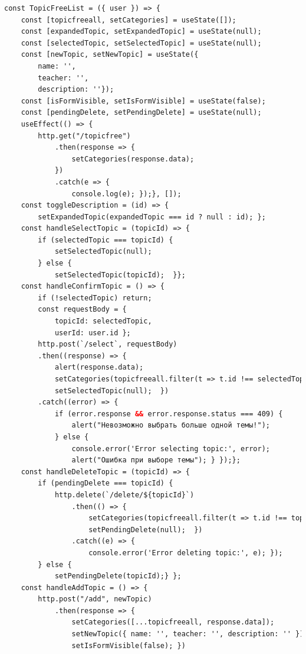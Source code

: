 \documentclass[14pt]{extarticle} %
\begin{document}
\label{topicFreeList}

\begin{lstlisting}[language=html, caption={Клиентская часть TopicFreeList}]
const TopicFreeList = ({ user }) => {
    const [topicfreeall, setCategories] = useState([]);
    const [expandedTopic, setExpandedTopic] = useState(null);
    const [selectedTopic, setSelectedTopic] = useState(null);
    const [newTopic, setNewTopic] = useState({
        name: '',
        teacher: '',
        description: ''});
    const [isFormVisible, setIsFormVisible] = useState(false);
    const [pendingDelete, setPendingDelete] = useState(null);
    useEffect(() => {
        http.get("/topicfree")
            .then(response => {
                setCategories(response.data);
            })
            .catch(e => {
                console.log(e); });}, []);
    const toggleDescription = (id) => {
        setExpandedTopic(expandedTopic === id ? null : id); };
    const handleSelectTopic = (topicId) => {
        if (selectedTopic === topicId) {
            setSelectedTopic(null); 
        } else {
            setSelectedTopic(topicId);  }};
    const handleConfirmTopic = () => {
        if (!selectedTopic) return;
        const requestBody = {
            topicId: selectedTopic,
            userId: user.id };
        http.post(`/select`, requestBody)
        .then((response) => {
            alert(response.data); 
            setCategories(topicfreeall.filter(t => t.id !== selectedTopic)); 
            setSelectedTopic(null);  })
        .catch((error) => {
            if (error.response && error.response.status === 409) {
                alert("Невозможно выбрать больше одной темы!"); 
            } else {
                console.error('Error selecting topic:', error);
                alert("Ошибка при выборе темы"); } });};
    const handleDeleteTopic = (topicId) => {
        if (pendingDelete === topicId) {
            http.delete(`/delete/${topicId}`)
                .then(() => {
                    setCategories(topicfreeall.filter(t => t.id !== topicId));
                    setPendingDelete(null);  })
                .catch((e) => {
                    console.error('Error deleting topic:', e); });
        } else {
            setPendingDelete(topicId);} };
    const handleAddTopic = () => {
        http.post("/add", newTopic)
            .then(response => {
                setCategories([...topicfreeall, response.data]);
                setNewTopic({ name: '', teacher: '', description: '' });
                setIsFormVisible(false); })

\end{lstlisting}
\end{document}
